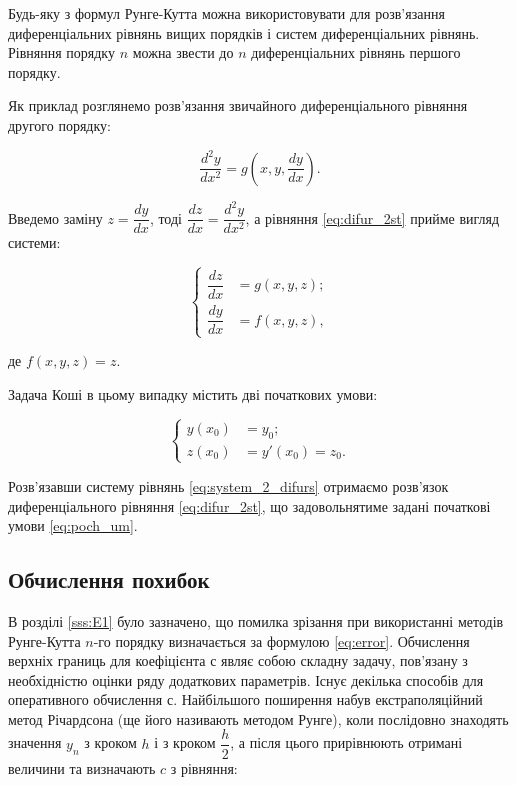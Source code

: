 Будь-яку з формул Рунге-Кутта можна використовувати для
розв’язання диференціальних рівнянь вищих порядків і систем
диференціальних рівнянь. Рівняння порядку $n$ можна звести до
$n$ диференціальних рівнянь першого порядку.

Як приклад розглянемо розв'язання звичайного диференціального
рівняння другого порядку:

\begin{equation}\label{eq:difur_2st}
  \frac{d^2y}{dx^2} = g\left({x,y,\frac{dy}{dx}}\right).
\end{equation}

Введемо заміну $z=\dfrac{dy}{dx}$, 
тоді $\dfrac{dz}{dx}=\dfrac{d^2y}{dx^2}$,
а рівняння \eqref{eq:difur_2st} прийме вигляд системи:

\begin{equation}\label{eq:system_2_difurs}
    \left\{
    \begin{aligned}
      \dfrac{dz}{dx}&= g(x,y,z);\\
      \dfrac{dy}{dx}&= f(x,y,z),
    \end{aligned}
    \right.
\end{equation}

де $f(x,y,z)=z$.

Задача Коші в цьому випадку містить дві початкових умови:

\begin{equation}\label{eq:poch_um}
    \left\{
    \begin{aligned}
      y(x_0)&= y_0;\\
      z(x_0)&=y'(x_0)=z_0.
    \end{aligned}
    \right.
\end{equation}

Розв'язавши систему рівнянь \eqref{eq:system_2_difurs} отримаємо
розв'язок диференціального рівняння \eqref{eq:difur_2st}, що
задовольнятиме задані початкові умови \eqref{eq:poch_um}.

\subsection{Обчислення похибок}\label{ss:errors}

В розділі \ref{sss:E1} було зазначено, що помилка зрізання при
використанні методів Рунге-Кутта $n$-го порядку визначається за
формулою \eqref{eq:error}. Обчислення верхніх границь для
коефіцієнта с являє собою складну задачу, пов’язану з необхідністю
оцінки ряду додаткових параметрів. Існує декілька способів для
оперативного обчислення $с$. Найбільшого поширення набув
екстраполяційний метод Річардсона (ще його називають методом Рунге),
коли послідовно знаходять значення $y_n$ з кроком $h$ і з кроком
$\dfrac{h}{2}$, а після цього прирівнюють отримані величини та
визначають $c$ з рівняння:

